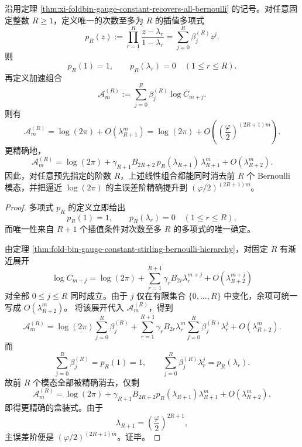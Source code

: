 \begin{theorem}\label{thm:xi-foldbin-gauge-constant-arbitrary-order-bernoulli-annihilator}
沿用定理 \ref{thm:xi-foldbin-gauge-constant-recovers-all-bernoulli} 的记号。对任意固定整数 \(R\ge 1\)，定义唯一的次数至多为 \(R\) 的插值多项式
\[
\boxed{\;
p_R(z):=\prod_{r=1}^{R}\frac{z-\lambda_r}{1-\lambda_r}
=\sum_{j=0}^{R}\beta_j^{(R)}z^j.\;}
\]
则
\[
p_R(1)=1,
\qquad
p_R(\lambda_r)=0\quad(1\le r\le R).
\]
再定义加速组合
\[
\mathcal A_m^{(R)}:=\sum_{j=0}^{R}\beta_j^{(R)}\log C_{m+j}.
\]
则有
\[
\boxed{\;
\mathcal A_m^{(R)}
=
\log(2\pi)+O(\lambda_{R+1}^m)
=
\log(2\pi)+O\!\left(\left(\frac{\varphi}{2}\right)^{(2R+1)m}\right).\;}
\]
更精确地，
\[
\boxed{\;
\mathcal A_m^{(R)}
=
\log(2\pi)
+\gamma_{R+1}B_{2R+2}\,p_R(\lambda_{R+1})\,\lambda_{R+1}^m
+O(\lambda_{R+2}^m).\;}
\]
因此，对任意预先指定的阶数 \(R\)，上述线性组合都能同时消去前 \(R\) 个 Bernoulli 模态，并把逼近 \(\log(2\pi)\) 的主误差阶精确提升到 \((\varphi/2)^{(2R+1)m}\)。
\end{theorem}
\begin{proof}
多项式 \(p_R\) 的定义立即给出
\[
p_R(1)=1,
\qquad
p_R(\lambda_r)=0\quad(1\le r\le R),
\]
而唯一性来自 \(R+1\) 个插值条件对次数至多 \(R\) 的多项式的唯一确定。

由定理 \ref{thm:fold-bin-gauge-constant-stirling-bernoulli-hierarchy}，对固定 \(R\) 有渐近展开
\[
\log C_{m+j}
=
\log(2\pi)+\sum_{r=1}^{R+1}\gamma_r B_{2r}\lambda_r^{m+j}+O(\lambda_{R+2}^{m+j})
\]
对全部 \(0\le j\le R\) 同时成立。由于 \(j\) 仅在有限集合 \(\{0,\dots,R\}\) 中变化，余项可统一写成 \(O(\lambda_{R+2}^m)\)。
将该展开代入 \(\mathcal A_m^{(R)}\)，得到
\[
\mathcal A_m^{(R)}
=
\log(2\pi)\sum_{j=0}^{R}\beta_j^{(R)}
+\sum_{r=1}^{R+1}\gamma_r B_{2r}\lambda_r^m
\sum_{j=0}^{R}\beta_j^{(R)}\lambda_r^j
+O(\lambda_{R+2}^m).
\]
而
\[
\sum_{j=0}^{R}\beta_j^{(R)}=p_R(1)=1,
\qquad
\sum_{j=0}^{R}\beta_j^{(R)}\lambda_r^j=p_R(\lambda_r).
\]
故前 \(R\) 个模态全部被精确消去，仅剩
\[
\mathcal A_m^{(R)}
=
\log(2\pi)+\gamma_{R+1}B_{2R+2}p_R(\lambda_{R+1})\lambda_{R+1}^m+O(\lambda_{R+2}^m),
\]
即得更精确的盒装式。由于
\[
\lambda_{R+1}=\left(\frac{\varphi}{2}\right)^{2R+1},
\]
主误差阶便是 \((\varphi/2)^{(2R+1)m}\)。证毕。
\end{proof}

